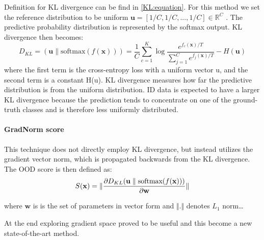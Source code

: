 Definition for KL divergence can be find in \autoref{KL:equation}.
For this method we set the reference distribution to be uniform $\mathbf{u} = [1/C, 1/C, ..., 1/C] \in \mathbb{R}^C$ . The predictive probability distribution is represented by the softmax output.
KL divergence then becomes:
\begin{equation}
\label{KL:equation2}
    D_{KL} = (\mathbf{u} \parallel \text{softmax}(f(\mathbf{x}))) =
    \frac{1}{C}\sum_{c=1}^{K}{\log{\frac{e^{f_c(\mathbf{x})/T}}
                                           {\sum_{j=1}^{C}{e^{f_j(\mathbf{x})/T}}}}} - H(\mathbf{u})
\end{equation}
where the first term is the cross-entropy loss with a uniform vector u, and the second term is a constant H(u). 
KL divergence measures how far the predictive distribution is from the uniform distribution. 
ID data is expected to have a larger KL divergence because the prediction tends to concentrate on one of the ground-truth classes and is therefore less uniformly distributed. 

\paragraph{GradNorm score}
This technique does not directly employ KL divergence, but instead utilizes the gradient vector norm, which is propagated backwards from the KL divergence. The OOD score is then defined as:
\begin{equation}
\label{KL:equation3}
    S(\mathbf{x}) = 
    \Vert
    \pdv{D_{KL}(\mathbf{u} \parallel \text{softmax}(f(\mathbf{x})))}
    {\mathbf{w}}
    \Vert
\end{equation}

where $\mathbf{w}$ is is the set of parameters in vector form and $\Vert$.$\Vert$ denotes $L_1$ norm\dots

At the end exploring gradient space proved to be useful and this become a new state-of-the-art method.